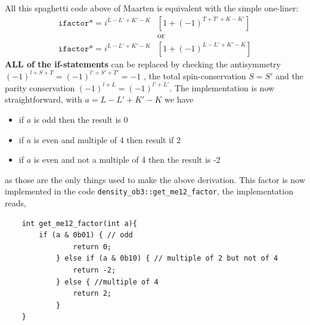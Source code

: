 \documentclass[10pt]{article}
\begin{document}
All this spaghetti code above of Maarten is equivalent with the simple 
one-liner:
\begin{align*}
\texttt{ifactor} *= i^{L-L'+K'-K} & \left[ 1 + (-1)^{T+T'+K-K'} \right] \\
& \text{or} \\
\texttt{ifactor} *= i^{L-L'+K'-K} & \left[ 1 + (-1)^{L-L'+K'-K} \right]  
\end{align*}
\textbf{ALL of the if-statements} can be replaced by checking the antisymmetry 
$(-1)^{l+S+T} = (-1)^{l'+S'+T'} = -1$ , the total spin-conservation $S=S'$ and 
the parity conservation $(-1)^{l+L}=(-1)^{l'+L'}$.
The implementation is now straightforward, with $a=L-L'+K'-K$ we have
\begin{itemize}
	\item if $a$ is odd then the result is 0 
	\item if $a$ is even and multiple of 4 then result if 2
	\item if $a$ is even and not a multiple of 4 then the result is -2
\end{itemize}
as those are the only things used to make the above derivation.
This factor is now implemented in the code 
\texttt{density\_ob3::get\_me12\_factor}, the implementation reads,
\begin{verbatim}
	int get_me12_factor(int a){
        if (a & 0b01) { // odd
        	    return 0;
        	} else if (a & 0b10) { // multiple of 2 but not of 4
        	    return -2;
        	} else { //multiple of 4
        	    return 2; 
        	}
    }
\end{verbatim}
\end{document}
